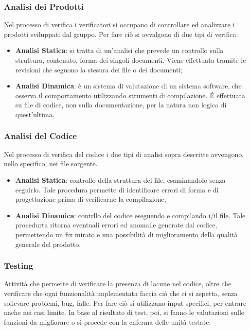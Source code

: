 \documentclass[a4paper, 12pt]{article}
\begin{document}
\subsubsection{Analisi dei Prodotti}
Nel processo di verifica i verificatori si occupano di controllare ed analizzare i prodotti sviluppati dal gruppo. Per fare ciò si avvalgono di due tipi di verifica:
\begin{itemize}
    \item \textbf{Analisi Statica}: si tratta di un'analisi che prevede un controllo sulla struttura, contenuto, forma dei singoli documenti. Viene effettuata tramite le revisioni che seguono la stesura dei file o dei documenti;
    \item \textbf{Analisi Dinamica}: è un sistema di valutazione di un sistema software, che osserva il comportamento utilizzando strumenti di compilazione. \'E effettuata su file di codice, non sulla documentazione, per la natura non logica di quest'ultima. 
\end{itemize}

\subsubsection{Analisi del Codice}
Nel processo di verifica del codice i due tipi di analisi sopra descritte avvengono, nello specifico, nei file sorgente.
\begin{itemize}
    \item \textbf{Analisi Statica}: controllo della struttura del file, esaminandolo senza eeguirlo. Tale procedura permette di identificare errori di forma e di progettazione prima di verificarne la compilazione,
    \item \textbf{Analisi Dinamica}: contrllo del codice eseguendo e compilando i/il file. Tale procedurta ritorna eventuali errori ed anomaile generate dal codice, permettendo un fix mirato e una possibilità di miglioramento della qualità generale del prodotto. 
\end{itemize}

\subsubsection{Testing}
Attività che permette di verificare la presenza di lacune nel codice, oltre che verificare che ogni funzionalità implementata faccia ciò che ci si aspetta, senza sollevare problemi, bug, falle. Per fare ciò si utilizzano input specifici, per entrare anche nei casi limite. In base al risultato di test, poi, si fanno le valutazioni sulle funzioni da migliorare o si procede con la cnferma delle unità testate.
\end{document}
